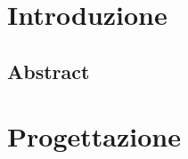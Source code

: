 \documentclass[a4paper]{article}
\begin{document}
    \copertina

    \tableofcontents

    \newpage

    \section{Introduzione}
	    	\subsection{Abstract}
		    	

	\newpage



	\section{Progettazione}
\end{document}
